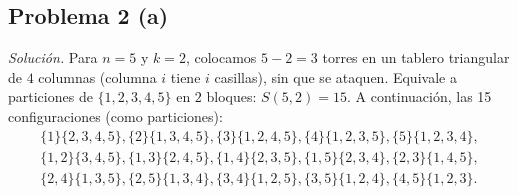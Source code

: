 \subsection*{Problema 2 (a)}
\emph{Solución.}
Para \(n=5\) y \(k=2\), colocamos \(5-2=3\) torres en un tablero triangular de \(4\) columnas (columna \(i\) tiene \(i\) casillas), sin que se ataquen. Equivale a particiones de \(\{1,2,3,4,5\}\) en \(2\) bloques: \(S(5,2)=15\). A continuación, las 15 configuraciones (como particiones):
\[
\begin{gathered}
\{1\}\{2,3,4,5\},
\{2\}\{1,3,4,5\},
\{3\}\{1,2,4,5\},
\{4\}\{1,2,3,5\},
\{5\}\{1,2,3,4\},\\
\{1,2\}\{3,4,5\},
\{1,3\}\{2,4,5\},
\{1,4\}\{2,3,5\},
\{1,5\}\{2,3,4\},
\{2,3\}\{1,4,5\},\\
\{2,4\}\{1,3,5\},
\{2,5\}\{1,3,4\},
\{3,4\}\{1,2,5\},
\{3,5\}\{1,2,4\},
\{4,5\}\{1,2,3\}.
\end{gathered}
\]
